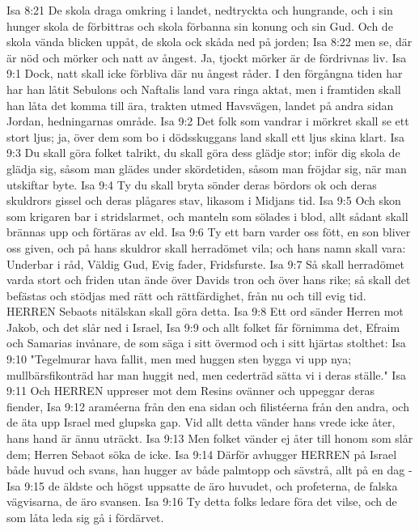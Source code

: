 Isa 8:21  De skola draga omkring i landet, nedtryckta och hungrande, och i sin hunger skola de förbittras och skola förbanna sin konung och sin Gud. Och de skola vända blicken uppåt, de skola ock skåda ned på jorden;
Isa 8:22  men se, där är nöd och mörker och natt av ångest. Ja, tjockt mörker är de fördrivnas liv.
Isa 9:1  Dock, natt skall icke förbliva där nu ångest råder. I den förgångna tiden har har han låtit Sebulons och Naftalis land vara ringa aktat, men i framtiden skall han låta det komma till ära, trakten utmed Havsvägen, landet på andra sidan Jordan, hedningarnas område.
Isa 9:2  Det folk som vandrar i mörkret skall se ett stort ljus; ja, över dem som bo i dödsskuggans land skall ett ljus skina klart.
Isa 9:3  Du skall göra folket talrikt, du skall göra dess glädje stor; inför dig skola de glädja sig, såsom man glädes under skördetiden, såsom man fröjdar sig, när man utskiftar byte.
Isa 9:4  Ty du skall bryta sönder deras bördors ok och deras skuldrors gissel och deras plågares stav, likasom i Midjans tid.
Isa 9:5  Och skon som krigaren bar i stridslarmet, och manteln som sölades i blod, allt sådant skall brännas upp och förtäras av eld.
Isa 9:6  Ty ett barn varder oss fött, en son bliver oss given, och på hans skuldror skall herradömet vila; och hans namn skall vara: Underbar i råd, Väldig Gud, Evig fader, Fridsfurste.
Isa 9:7  Så skall herradömet varda stort och friden utan ände över Davids tron och över hans rike; så skall det befästas och stödjas med rätt och rättfärdighet, från nu och till evig tid. HERREN Sebaots nitälskan skall göra detta.
Isa 9:8  Ett ord sänder Herren mot Jakob, och det slår ned i Israel,
Isa 9:9  och allt folket får förnimma det, Efraim och Samarias invånare, de som säga i sitt övermod och i sitt hjärtas stolthet:
Isa 9:10  "Tegelmurar hava fallit, men med huggen sten bygga vi upp nya; mullbärsfikonträd har man huggit ned, men cederträd sätta vi i deras ställe."
Isa 9:11  Och HERREN uppreser mot dem Resins ovänner och uppeggar deras fiender,
Isa 9:12  araméerna från den ena sidan och filistéerna från den andra, och de äta upp Israel med glupska gap. Vid allt detta vänder hans vrede icke åter, hans hand är ännu uträckt.
Isa 9:13  Men folket vänder ej åter till honom som slår dem; Herren Sebaot söka de icke.
Isa 9:14  Därför avhugger HERREN på Israel både huvud och svans, han hugger av både palmtopp och sävstrå, allt på en dag -
Isa 9:15  de äldste och högst uppsatte de äro huvudet, och profeterna, de falska vägvisarna, de äro svansen.
Isa 9:16  Ty detta folks ledare föra det vilse, och de som låta leda sig gå i fördärvet.
